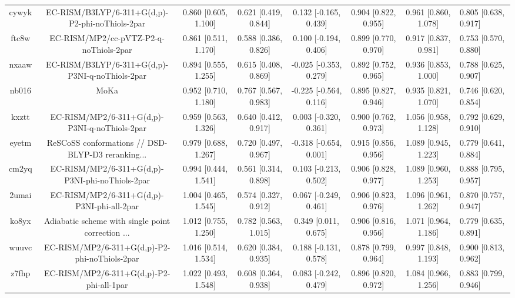 \documentclass{article}
\begin{document}
\begin{center}
\begin{longtable}{|ccccccc|}
 cywyk &    EC-RISM/B3LYP/6-311+G(d,p)-P2-phi-noThiols-2par &  0.860 [0.605, 1.100] &  0.621 [0.419, 0.844] &   0.132 [-0.165, 0.439] &  0.904 [0.822, 0.955] &   0.961 [0.860, 1.078] &   0.805 [0.638, 0.917] \\
 ftc8w &             EC-RISM/MP2/cc-pVTZ-P2-q-noThiols-2par &  0.861 [0.511, 1.170] &  0.588 [0.386, 0.826] &   0.100 [-0.194, 0.406] &  0.899 [0.770, 0.970] &   0.917 [0.837, 0.981] &   0.753 [0.570, 0.880] \\
 nxaaw &    EC-RISM/B3LYP/6-311+G(d,p)-P3NI-q-noThiols-2par &  0.894 [0.555, 1.255] &  0.615 [0.408, 0.869] &  -0.025 [-0.353, 0.279] &  0.892 [0.752, 0.965] &   0.936 [0.853, 1.000] &   0.788 [0.625, 0.907] \\
 nb016 &                                               MoKa &  0.952 [0.710, 1.180] &  0.767 [0.567, 0.983] &  -0.225 [-0.564, 0.116] &  0.895 [0.827, 0.946] &   0.935 [0.821, 1.070] &   0.746 [0.620, 0.854] \\
 kxztt &      EC-RISM/MP2/6-311+G(d,p)-P3NI-q-noThiols-2par &  0.959 [0.563, 1.326] &  0.640 [0.412, 0.917] &   0.003 [-0.320, 0.361] &  0.900 [0.762, 0.973] &   1.056 [0.958, 1.128] &   0.792 [0.629, 0.910] \\
 eyetm &  ReSCoSS conformations // DSD-BLYP-D3 reranking... &  0.979 [0.688, 1.267] &  0.720 [0.497, 0.967] &  -0.318 [-0.654, 0.001] &  0.915 [0.856, 0.956] &   1.089 [0.945, 1.223] &   0.779 [0.641, 0.884] \\
 cm2yq &    EC-RISM/MP2/6-311+G(d,p)-P3NI-phi-noThiols-2par &  0.994 [0.444, 1.541] &  0.561 [0.314, 0.898] &   0.103 [-0.213, 0.502] &  0.906 [0.828, 0.977] &   1.089 [0.960, 1.253] &   0.888 [0.795, 0.957] \\
 2umai &         EC-RISM/MP2/6-311+G(d,p)-P3NI-phi-all-2par &  1.004 [0.465, 1.545] &  0.574 [0.327, 0.912] &   0.067 [-0.249, 0.461] &  0.906 [0.823, 0.976] &   1.096 [0.961, 1.262] &   0.870 [0.757, 0.947] \\
 ko8yx &  Adiabatic scheme with single point correction ... &  1.012 [0.755, 1.250] &  0.782 [0.563, 1.015] &    0.349 [0.011, 0.675] &  0.906 [0.816, 0.956] &   1.071 [0.964, 1.186] &   0.779 [0.635, 0.891] \\
 wuuvc &      EC-RISM/MP2/6-311+G(d,p)-P2-phi-noThiols-2par &  1.016 [0.514, 1.534] &  0.620 [0.384, 0.935] &   0.188 [-0.131, 0.578] &  0.878 [0.799, 0.964] &   0.997 [0.848, 1.193] &   0.900 [0.813, 0.962] \\
 z7fhp &           EC-RISM/MP2/6-311+G(d,p)-P2-phi-all-1par &  1.022 [0.493, 1.548] &  0.608 [0.364, 0.938] &   0.083 [-0.242, 0.479] &  0.896 [0.820, 0.972] &   1.084 [0.966, 1.256] &   0.883 [0.799, 0.946] \\

\end{longtable}
\end{center}
\end{document}
